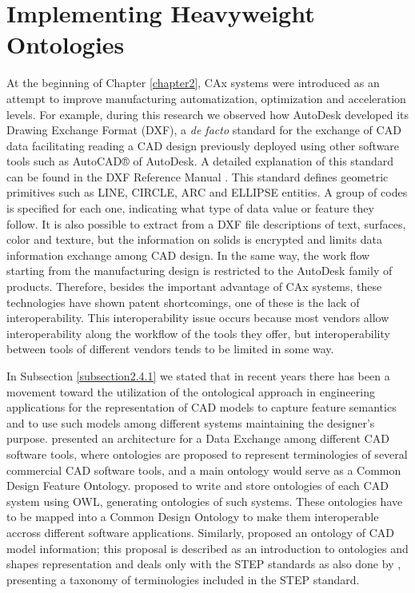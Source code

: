 \section{Implementing Heavyweight Ontologies}\label{section4.4}


At the beginning of Chapter \ref{chapter2}, CAx systems were introduced as an attempt to improve manufacturing automatization, optimization and acceleration levels. For example, during this research we observed how AutoDesk developed its Drawing Exchange Format (DXF), a \textit{de facto} standard for the exchange of CAD data facilitating reading a CAD design previously deployed using other software tools such as AutoCAD® of AutoDesk. A detailed explanation of this standard can be found in the DXF Reference Manual \citep{autodesk_dxf_2009}.  This standard defines geometric primitives such as LINE, CIRCLE, ARC and ELLIPSE entities. A group of codes is specified for each one, indicating what type of data value or feature they follow. It is also possible to extract from a DXF file descriptions of text, surfaces, color and texture, but the information on solids is encrypted \citep{choi_exchange_2003} and limits data information exchange among CAD design. In the same way, the work flow starting from the manufacturing design is restricted to the AutoDesk family of products. Therefore, besides the important advantage of CAx systems, these technologies have shown patent shortcomings, one of these is the lack of interoperability.  This interoperability issue occurs because most vendors allow interoperability along the workflow of the tools they offer, but interoperability between tools of different vendors tends to be limited in some way.


In Subsection \ref{subsection2.4.1} we stated that in recent years there has been a movement toward the utilization of the ontological approach in engineering applications for the representation of  CAD models to capture feature semantics and to use such models among different systems maintaining the designer’s purpose. \cite{abdul-ghafour_common_2007} presented an architecture for a Data Exchange among different CAD software tools, where ontologies are proposed to represent terminologies of several commercial CAD software tools, and a main ontology would serve as a Common Design Feature Ontology. \cite{abdul-ghafour_common_2007} proposed to write and store ontologies of each CAD system using OWL, generating ontologies of such systems.   These ontologies have to be mapped into a Common Design Ontology to make them interoperable accross different software applications. Similarly, \cite{andersen_building_2007} proposed an ontology of CAD model information; this proposal is described as an introduction to ontologies and shapes representation and deals only with the STEP standards as also done by \cite{abdul-ghafour_common_2007}, presenting a taxonomy of terminologies included in the STEP standard. 

